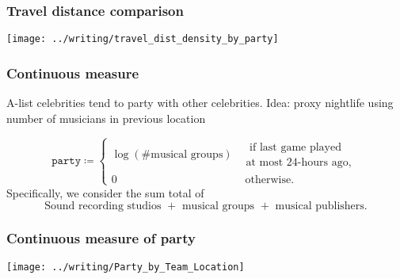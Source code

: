 \documentclass{beamer}
\begin{document}
\begin{frame}   
  \frametitle{Travel distance comparison}
  \centering \texttt{[image: ../writing/travel\_dist\_density\_by\_party]} 
\end{frame}


\begin{frame}   \frametitle{Continuous measure}
  \begin{block}{A-list celebrities tend to party with other celebrities.}     Idea: proxy nightlife using number of musicians in previous location

    \[
      \texttt{party} \coloneqq \begin{cases}       \log \left(\# \textrm{musical groups}\right) &\substack{\textrm{ if last game played} \\ \textrm{at most 24-hours ago,}} \\
      0 &\textrm{ otherwise.}
    \end{cases}
    \]
    \newline
    Specifically, we consider the sum total of
    \[
      \textrm{Sound recording studios } + \textrm{ musical groups } + \textrm{ musical publishers}.
    \]   \end{block} \end{frame}

\begin{frame}   
  \frametitle{Continuous measure of party}
  \centering \texttt{[image: ../writing/Party\_by\_Team\_Location]} 
\end{frame}
\end{document}
